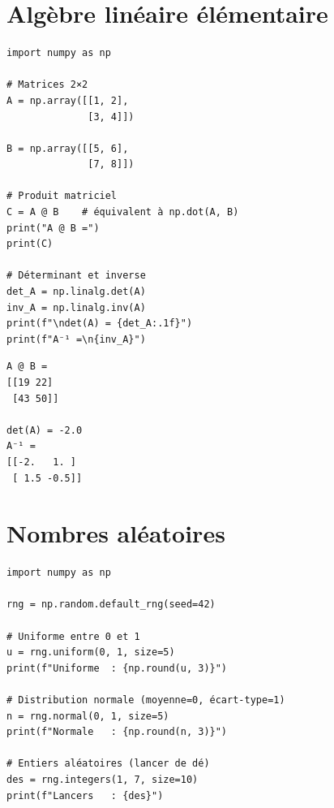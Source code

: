 \section{Alg\`ebre lin\'eaire \'el\'ementaire}

\begin{codeblock}[title=\textbf{Python}]
\begin{verbatim}
import numpy as np

# Matrices 2×2
A = np.array([[1, 2],
              [3, 4]])

B = np.array([[5, 6],
              [7, 8]])

# Produit matriciel
C = A @ B    # équivalent à np.dot(A, B)
print("A @ B =")
print(C)

# Déterminant et inverse
det_A = np.linalg.det(A)
inv_A = np.linalg.inv(A)
print(f"\ndet(A) = {det_A:.1f}")
print(f"A⁻¹ =\n{inv_A}")
\end{verbatim}
\end{codeblock}

\begin{codeoutput}
\begin{verbatim}
A @ B =
[[19 22]
 [43 50]]

det(A) = -2.0
A⁻¹ =
[[-2.   1. ]
 [ 1.5 -0.5]]
\end{verbatim}
\end{codeoutput}

\section{Nombres al\'eatoires}

\begin{codeblock}[title=\textbf{Python}]
\begin{verbatim}
import numpy as np

rng = np.random.default_rng(seed=42)

# Uniforme entre 0 et 1
u = rng.uniform(0, 1, size=5)
print(f"Uniforme  : {np.round(u, 3)}")

# Distribution normale (moyenne=0, écart-type=1)
n = rng.normal(0, 1, size=5)
print(f"Normale   : {np.round(n, 3)}")

# Entiers aléatoires (lancer de dé)
des = rng.integers(1, 7, size=10)
print(f"Lancers   : {des}")
\end{verbatim}
\end{codeblock}

